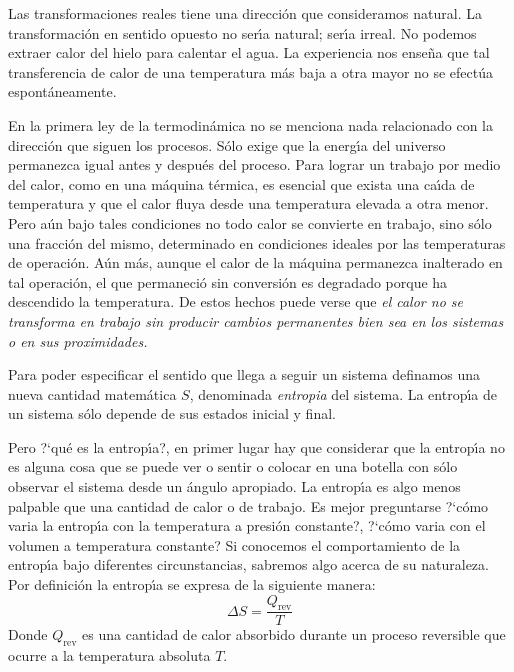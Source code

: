 Las transformaciones reales tiene una direcci\'on que consideramos natural. La transformaci\'on en sentido opuesto no ser\'{\i}a natural; ser\'{\i}a irreal. No podemos extraer calor del hielo para calentar el agua. La experiencia nos ense\~na  que tal transferencia de calor de una temperatura m\'as baja a otra mayor no se efect\'ua espont\'aneamente.

 En la primera ley de la termodin\'amica no se menciona nada relacionado con la direcci\'on que siguen los procesos. S\'olo exige que la energ\'{\i}a del universo permanezca igual antes y  despu\'es del proceso. Para lograr un trabajo por medio del calor, como en una m\'aquina t\'ermica, es esencial que exista una ca\'{\i}da de temperatura y que el calor fluya desde una tempe\-ratura elevada a otra menor. Pero a\'un bajo tales condiciones no todo calor se convierte en trabajo, sino s\'olo una fracci\'on del mismo, determinado en condiciones ideales por las temperaturas de operaci\'on. A\'un m\'as, aunque el calor de la m\'aquina permanezca inalterado en tal operaci\'on, el que permaneci\'o sin conversi\'on es degradado porque ha descendido la temperatura. De estos hechos puede verse que \textit{el calor no se transforma en trabajo sin producir cambios permanentes bien sea en los sistemas o en sus proximidades.}

Para poder especificar el sentido que llega a seguir un sistema definamos una nueva cantidad matem\'atica $S$, denominada \textit{\gls{entropia}} del sistema. La entrop\'{\i}a  de un sistema s\'olo depende de sus estados inicial y final.

Pero ?`qu\'e es la entrop\'{\i}a?, en primer lugar hay que considerar que la entrop\'{\i}a no es alguna cosa que se puede ver o sentir o colocar en una botella con s\'olo observar el sistema desde un \'angulo apropiado. La entrop\'{\i}a es algo menos palpable que una cantidad de calor o de trabajo. Es mejor preguntarse ?`c\'omo varia la entrop\'{\i}a con la temperatura a presi\'on constante?, ?`c\'omo varia con el volumen a temperatura constante? Si conocemos el comportamiento de la entrop\'{\i}a bajo diferentes circunstancias, sabremos algo acerca de su naturaleza.
Por definici\'on la entrop\'{\i}a se expresa de la siguiente manera:
   \begin{equation}
   \Delta S = \frac{Q _{\mathrm{rev}}}{T}
   \end{equation}
Donde $Q _{\mathrm{rev}}$ es una cantidad de calor absorbido durante un proceso reversible que ocurre a
la temperatura absoluta  $T$.

